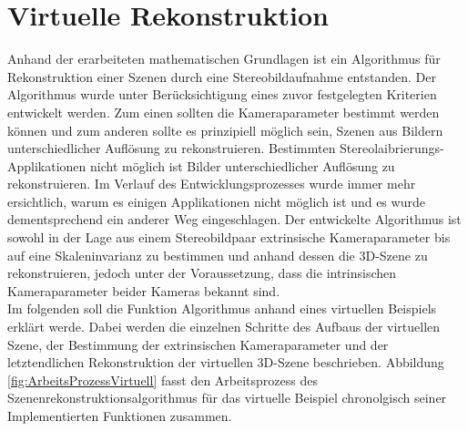 \chapter{Virtuelle Rekonstruktion}
\label{sec:minimal} 

Anhand der erarbeiteten mathematischen Grundlagen ist ein Algorithmus für Rekonstruktion einer Szenen durch eine Stereobildaufnahme entstanden. Der Algorithmus wurde unter Berücksichtigung eines zuvor festgelegten Kriterien entwickelt werden. Zum einen sollten die Kameraparameter bestimmt werden können und zum anderen sollte es prinzipiell möglich sein, Szenen aus Bildern unterschiedlicher Auflösung zu rekonstruieren. Bestimmten Stereolaibrierungs-Applikationen nicht möglich ist Bilder unterschiedlicher Auflösung zu rekonstruieren. Im Verlauf des Entwicklungsprozesses wurde immer mehr ersichtlich, warum es einigen Applikationen nicht möglich ist und es wurde dementsprechend ein anderer Weg eingeschlagen. Der entwickelte Algorithmus ist sowohl in der Lage aus einem Stereobildpaar extrinsische Kameraparameter bis auf eine Skaleninvarianz zu bestimmen und anhand dessen die 3D-Szene zu rekonstruieren, jedoch unter der Voraussetzung, dass die intrinsischen Kameraparameter beider Kameras bekannt sind.\\

Im folgenden soll die Funktion Algorithmus anhand eines virtuellen Beispiels erklärt werde. Dabei werden die einzelnen Schritte des Aufbaus der virtuellen Szene, der Bestimmung der extrinsischen Kameraparameter und der letztendlichen Rekonstruktion der virtuellen 3D-Szene beschrieben. Abbildung \ref{fig:ArbeitsProzessVirtuell} fasst den Arbeitsprozess des Szenenrekonstruktionsalgorithmus für das virtuelle Beispiel chronolgisch seiner Implementierten Funktionen zusammen. \\


%
%
%

